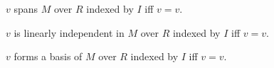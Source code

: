 \begin{definition}\label{spike_phrase_indexed_module_spanning}
    $v$ spans $M$ over $R$ indexed by $I$ iff $v=v$.
\end{definition}
\begin{definition}\label{spike_phrase_indexed_module_linear_independence}
    $v$ is linearly independent in $M$ over $R$ indexed by $I$ iff $v=v$.
\end{definition}
\begin{definition}\label{spike_phrase_indexed_module_basis}
    $v$ forms a basis of $M$ over $R$ indexed by $I$ iff $v=v$.
\end{definition}
